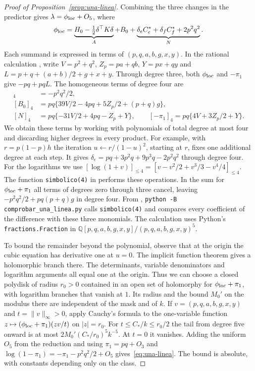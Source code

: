 \begin{proof}[Proof of Proposition~\ref{prop:una-linea}]
Combining the three changes in the predictor gives $\lambda=\phi_{\mathrm{loc}}+O_5$, where
\[
 \phi_{\mathrm{loc}}=\underbrace{H_0-\tfrac12\delta^\top K\delta}_{A}
      +B_0+\underbrace{\delta_e C_e^*+\delta_f C_f^*+2p^2q^2}_{N}.
\]
Each summand is expressed in terms of $(p,q,a,b,g,x,y)$. In the rational calculation , write
$V=p^2+q^2$, $Z_p=pa+qb$, $Y=px+qy$ and $L=p+q+(a+b)/2+g+x+y$. Through degree three, both
$\phi_{\mathrm{loc}}$ and $-\pi_1$ give $-pq+pqL$. The homogeneous terms of degree four are
\begin{align*}
 [A]_4&=-p^2q^2/2,\\
 [B_0]_4&=pq\{39V/2-4pq+5Z_p/2+(p+q)g\},\\
 [N]_4&=pq\{-31V/2+4pq-Z_p+Y\},\qquad [-\pi_1]_4=pq\{4V+3Z_p/2+Y\}.
\end{align*}
We obtain these terms by working with polynomials of total degree at most four and discarding
higher degrees in every product. For example, with $r=p(1-p)h$ the iteration $u\leftarrow
r/(1-u)^2$, starting at $r$, fixes one additional degree at each step. It gives
$\delta_e=pq+3p^2q+9p^3q-2p^2q^2$ through degree four. For the logarithms we use
$[\log(1+v)]_{\le4}=[v-v^2/2+v^3/3-v^4/4]_{\le4}$. The function \texttt{simbolico(4)} in
 performs these operations. In the sum for $\phi_{\mathrm{loc}}+\pi_1$
all terms of degrees zero through three cancel, leaving $-p^2q^2/2+pq(p+q)g$ in degree four. From
, \texttt{python -B comprobar\_una\_linea.py} calls
\texttt{simbolico(4)} and compares every coefficient of the difference with these three monomials.
The calculation uses Python's \texttt{fractions.Fraction} in $\mathbb
Q[p,q,a,b,g,x,y]/(p,q,a,b,g,x,y)^5$.

To bound the remainder beyond the polynomial, observe that at the origin the cubic equation has
derivative one at $u=0$. The implicit function theorem gives a holomorphic branch there. The
determinants, variable denominators and logarithm arguments all equal one at the origin. Thus we
can choose a closed polydisk of radius $r_0>0$ contained in an open set of holomorphy for
$\phi_{\mathrm{loc}}+\pi_1$, with logarithm branches that vanish at $1$. Its radius and the bound $M_0'$ on
the modulus there are independent of the mask and of $k$. If $v=(p,q,a,b,g,x,y)$ and
$t=\|v\|_\infty>0$, apply Cauchy's formula to the one-variable function
$z\mapsto(\phi_{\mathrm{loc}}+\pi_1)(zv/t)$ on $|z|=r_0$. For $t\le C_*/k\le r_0/2$ the tail from degree
five onward is at most $2M_0'(C_*/r_0)^5k^{-5}$. At $t=0$ it vanishes. Adding the uniform $O_5$
from the reduction and using $\pi_1=pq+O_3$ and $\log(1-\pi_1)=-\pi_1-p^2q^2/2+O_5$
gives~\eqref{eq:una-linea}. The bound is absolute, with constants depending only on the class.
\end{proof}

